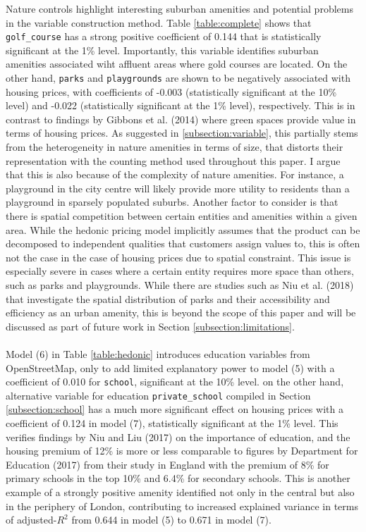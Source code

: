 \documentclass{article}
\begin{document}
Nature controls highlight interesting suburban amenities and potential problems in the variable construction method. Table \ref{table:complete} shows that \texttt{golf\_course} has a strong positive coefficient of 0.144 that is statistically significant at the 1\% level. Importantly, this variable  identifies suburban amenities associated wiht affluent areas where gold courses are located. On the other hand, \texttt{parks} and \texttt{playgrounds} are shown to be negatively associated with housing prices, with coefficients of -0.003 (statistically significant at the 10\% level) and -0.022 (statistically significant at the 1\% level), respectively. This is in contrast to findings by Gibbons et al. (2014) where green spaces provide value in terms of housing prices. As suggested in \ref{subsection:variable}, this partially stems from the heterogeneity in nature amenities in terms of size, that distorts their representation with the counting method used throughout this paper. I argue that this is also because of the complexity of nature amenities. For instance, a playground in the city centre will likely provide more utility to residents than a playground in sparsely populated suburbs. Another factor to consider is that there is spatial competition between certain entities and amenities within a given area. While the hedonic pricing model implicitly assumes that the product can be decomposed to independent qualities that customers assign values to, this is often not the case in the case of housing prices due to spatial constraint. This issue is especially severe in cases where a certain entity requires more space than others, such as parks and playgrounds. While there are studies such as Niu et al. (2018) that investigate the spatial distribution of parks and their accessibility and efficiency as an urban amenity, this is beyond the scope of this paper and will be discussed as part of future work in Section \ref{subsection:limitations}.\\\\
Model (6) in  Table \ref{table:hedonic} introduces education variables from OpenStreetMap, only to add limited explanatory power to model (5) with a coefficient of 0.010 for \texttt{school}, significant at the 10\% level. on the other hand, alternative variable for education \texttt{private\_school} compiled in Section \ref{subsection:school} has a much more significant effect on housing prices with a coefficient of 0.124 in model (7), statistically significant at the 1\% level. This verifies findings by Niu and Liu (2017) on the importance of education, and the housing premium of 12\% is more or less comparable to figures by Department for Education (2017) from their study in England with the premium of 8\% for primary schools in the top 10\% and 6.4\% for secondary schools.  This is another example of a strongly positive amenity identified not only in the central but also in the periphery of London, contributing to increased explained variance in terms of adjusted-$R^2$ from 0.644 in model (5) to 0.671 in model (7). \\\\
\end{document}
